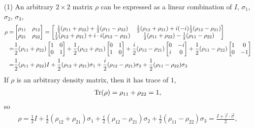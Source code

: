 \documentclass[en]{sol-man}
\begin{document}
\begin{sol}
    \item[(1)] An arbitrary $2\times 2$ matrix $\rho$ can be expressed as a linear combination of $I$, $\sigma_1$, $\sigma_2$, $\sigma_3$,
    \begin{align}
        \notag\rho=&\begin{bmatrix}
            \rho_{11}&\rho_{12}\\
            \rho_{21}&\rho_{22}
        \end{bmatrix}=\begin{bmatrix}
            \frac{1}{2}(\rho_{11}+\rho_{22})+\frac{1}{2}(\rho_{11}-\rho_{22})&\frac{1}{2}(\rho_{12}+\rho_{21})+i(-i)\frac{1}{2}(\rho_{12}-\rho_{21})\\
            \frac{1}{2}(\rho_{12}+\rho_{21})+i\cdot i(\rho_{12}-\rho_{21})&\frac{1}{2}(\rho_{11}+\rho_{22})-\frac{1}{2}(\rho_{11}-\rho_{22})
        \end{bmatrix}\\
        \notag=&\frac{1}{2}(\rho_{11}+\rho_{22})\begin{bmatrix}
            1&0\\
            0&1
        \end{bmatrix}+\frac{1}{2}(\rho_{12}+\rho_{21})\begin{bmatrix}
            0&1\\
            1&0
        \end{bmatrix}+\frac{i}{2}(\rho_{12}-\rho_{21})\begin{bmatrix}
            0&-i\\
            i&0
        \end{bmatrix}+\frac{1}{2}(\rho_{11}-\rho_{22})\begin{bmatrix}
            1&0\\
            0&-1
        \end{bmatrix}\\
        =&\frac{1}{2}(\rho_{11}+\rho_{22})I+\frac{1}{2}(\rho_{12}+\rho_{21})\sigma_1+\frac{i}{2}(\rho_{12}-\rho_{21})\sigma_2+\frac{1}{2}(\rho_{11}-\rho_{22})\sigma_3
    \end{align}
    If $\rho$ is an arbitrary density matrix, then it has trace of $1$,
    \begin{align}
        \operatorname{Tr}(\rho)=\rho_{11}+\rho_{22}=1,
    \end{align}
    so
    \begin{align}
        \rho=\frac{1}{2}I+\frac{1}{2}(\rho_{12}+\rho_{21})\sigma_1+\frac{i}{2}(\rho_{12}-\rho_{21})\sigma_2+\frac{1}{2}(\rho_{11}-\rho_{22})\sigma_3=\frac{I+\vec{r}\cdot\vec{\sigma}}{2},

\end{align}
\end{sol}
\end{document}
